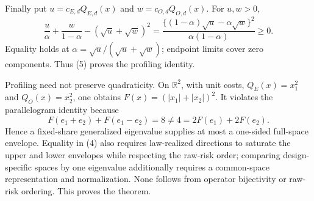 Finally put \(u=c_{E,d}Q_{E,d}(x)\) and \(w=c_{O,d}Q_{O,d}(x)\). For \(u,w>0\),
\[
 \frac{u}{\alpha}+\frac{w}{1-\alpha}-(\sqrt u+\sqrt w)^2
 =\frac{\{(1-\alpha)\sqrt u-\alpha\sqrt w\}^2}{\alpha(1-\alpha)}\ge0. \tag{5}
\]
Equality holds at \(\alpha=\sqrt u/(\sqrt u+\sqrt w)\); endpoint limits cover zero components. Thus (5) proves the profiling identity.

Profiling need not preserve quadraticity. On \(\mathbb R^2\), with unit costs, \(Q_E(x)=x_1^2\) and \(Q_O(x)=x_2^2\), one obtains \(F(x)=(|x_1|+|x_2|)^2\). It violates the parallelogram identity because
\[
 F(e_1+e_2)+F(e_1-e_2)=8\ne4=2F(e_1)+2F(e_2).
\]
Hence a fixed-share generalized eigenvalue supplies at most a one-sided full-space envelope. Equality in (4) also requires law-realized directions to saturate the upper and lower envelopes while respecting the raw-risk order; comparing design-specific spaces by one eigenvalue additionally requires a common-space representation and normalization. None follows from operator bijectivity or raw-risk ordering. This proves the theorem.
